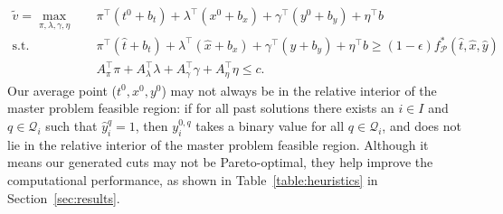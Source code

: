 \documentclass[11pt]{article}
\newcommand{\noi}{\noindent}
\begin{document}
	\begin{subequations} \label{prob:subMW}
		\begin{align}
		\tilde{v} = \max_{\pi,\lambda,\gamma,\eta} \quad & \pi^\top (t^0 + b_t) + \lambda^\top (x^0 + b_x) + \gamma^\top (y^0 + b_y) + \eta^\top b  \\
		\text{s.t.} \quad & \pi^\top (\hat{t} + b_t) + \lambda^\top (\hat{x} + b_x) + \gamma^\top (\hat{y} + b_y) + \eta^\top b \geq (1 - \epsilon) f^*_{\mathcal{P}}(\hat{t},\hat{x},\hat{y}) \\
		& A^\top_{\pi} \pi + A^\top_{\lambda} \lambda + A^\top_{\gamma} \gamma + A^\top_{\eta} \eta \leq c.
		\end{align}
	\end{subequations}
	\noi Our average point (\(t^0,x^0,y^0\)) may not always be in the relative interior of the master problem feasible region: if for all past solutions there exists an \(i \in I\) and \(q \in \mathcal{Q}_i\) such that \(\hat{y}_i^q = 1\), then \(y_i^{0,q}\) takes a binary value for all \(q \in \mathcal{Q}_i\), and does not lie in the relative interior of the master problem feasible region. Although it means our generated cuts may not be Pareto-optimal, they help improve the computational performance, as shown in Table~\ref{table:heuristics} in Section~\ref{sec:results}.
	
\end{document}
